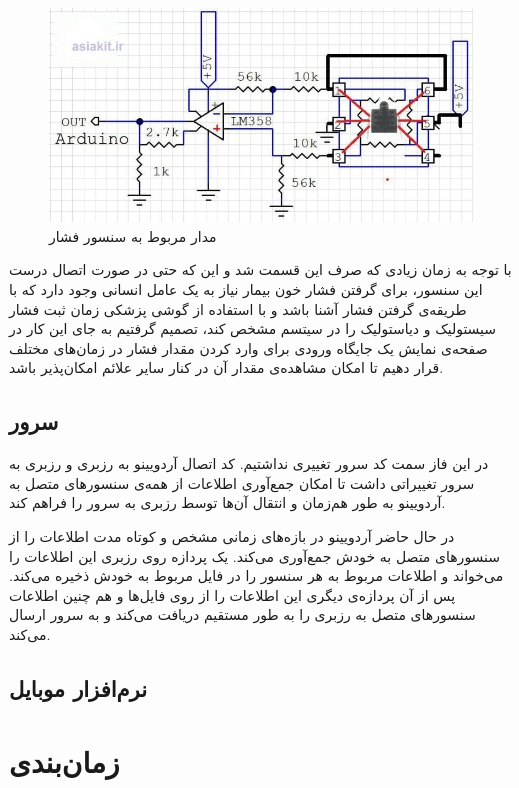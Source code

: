 \documentclass[12pt]{article}
\begin{document}
\begin{figure}[H]
	\begin{center}
		\includegraphics[width=.80\textwidth]{images/pressure.jpg}
	\end{center}
	\caption{مدار مربوط به سنسور فشار}
\end{figure}

با توجه به زمان زیادی که صرف این قسمت شد و این که حتی در صورت اتصال درست این سنسور، برای گرفتن فشار خون بیمار نیاز به یک عامل انسانی وجود دارد که با طریقه‌ی گرفتن فشار آشنا باشد و با استفاده از گوشی پزشکی زمان ثبت فشار سیستولیک و دیاستولیک را در سیتسم مشخص کند، تصمیم گرفتیم به جای این کار در صفحه‌ی نمایش یک جایگاه ورودی برای وارد کردن مقدار فشار در زمان‌های مختلف قرار دهیم تا امکان مشاهده‌ی مقدار آن در کنار سایر علائم امکان‌پذیر باشد.

\subsection{سرور}

در این فاز سمت کد سرور تغییری نداشتیم. کد اتصال آردویینو به رزبری و رزبری به سرور تغییراتی داشت تا امکان جمع‌آوری اطلاعات از همه‌ی سنسورهای متصل به آردویینو به طور هم‌زمان و انتقال آن‌ها توسط رزبری به سرور را فراهم کند.

در حال حاضر آردویینو در بازه‌ها‌ی زمانی مشخص و کوتاه مدت اطلاعات را از سنسورهای متصل به خودش جمع‌آوری می‌کند. یک پردازه روی رزبری این اطلاعات را می‌خواند و اطلاعات مربوط به هر سنسور را در فایل مربوط به خودش ذخیره می‌کند. پس از آن پردازه‌ی دیگری این اطلاعات را از روی فایل‌ها و هم چنین اطلاعات سنسورهای متصل به رزبری را به طور مستقیم دریافت می‌کند و به سرور ارسال می‌کند.

\subsection{نرم‌افزار موبایل}

\newpage
\section{زمان‌بندی} \label{gantt}
\end{document}
